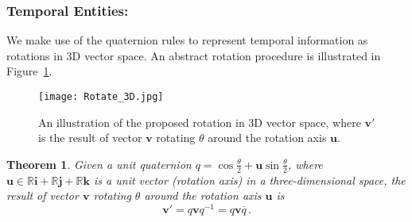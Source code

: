 \documentclass[11pt]{article}
\newcommand{\vect}[1]{\mathbf{#1}\xspace}
\newcommand{\vecti}{\vect{i}\xspace}
\newcommand{\vectj}{\vect{j}\xspace}
\newcommand{\vectk}{\vect{k}\xspace}
\newtheorem{theorem}{Theorem}
\begin{document}
\subsubsection{Temporal Entities:}
We make use of the quaternion rules to represent temporal information as rotations in 3D vector space.
An abstract rotation procedure is illustrated in Figure~\ref{figure:rotation}.

\begin{figure}[t]
\centering
\texttt{[image: Rotate\_3D.jpg]} 
\caption{An illustration of the proposed rotation in 3D vector space, where $\vect{v'}$ is the result of vector $\vect{v}$ rotating $\theta$ around the rotation axis $\vect{u}$.}
\label{figure:rotation}
\end{figure}

\begin{theorem} \label{Theorem_rotation}
Given a unit quaternion $q = \cos \frac{\theta}{2} + \vect{u} \sin \frac{\theta}{2}$, where $\vect{u} \in  \mathbb{R}\vecti +  \mathbb{R}\vectj +  \mathbb{R}\vectk$ is a unit  vector (rotation axis) in a three-dimensional space, the result of vector $\vect{v}$ rotating $\theta$ around the rotation axis $\vect{u}$ is
\begin{equation}\label{equation:rotation}
    \vect{v'} = q	\vect{v} q^{-1} = q	\vect{v} \overline{q} \, .
\end{equation}
\end{theorem}
\end{document}
